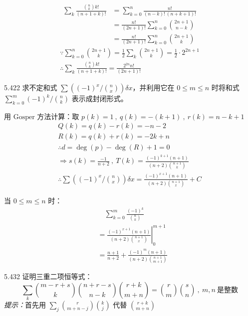 \begin{align*}
  \sum_k \frac{\binom{n}{k} k!}{(n+1+k)!} &= \sum_{k=0}^n \frac{n!}{(n-k)! \ (n+k+1)!} \\
  &= \frac{n!}{(2n+1)!} \sum_{k=0}^n \binom{2n+1}{n-k} \\
  &= \frac{n!}{(2n+1)!} \sum_{k=0}^n \binom{2n+1}{k}
\end{align*}
\begin{gather*}
  \because \sum_{k=0}^n \binom{2n+1}{k} = \frac{1}{2} \sum_k \binom{2n+1}{k} = \frac{1}{2} \cdot 2^{2n+1} \\
  \therefore \sum_k \frac{\binom{n}{k} k!}{(n+1+k)!} = \frac{2^{2n} n!}{(2n+1)!}
\end{gather*}

\begin{problem}{5.42}{2}
  求不定和式 \( \sum \left( (-1)^x / \binom{n}{x} \right) \delta x \)，并利用它在 \( 0 \le m \le n \) 时将和式 \( \sum_{k=0}^m (-1)^k / \binom{n}{k} \) 表示成封闭形式。
\end{problem}

用 \( \text{Gosper} \) 方法计算：取 \( p(k)=1 \ , \ q(k) = -(k+1) \ , \ r(k) = n-k+1 \)
\begin{gather*}
  Q(k) = q(k) - r(k) = -n-2 \\ R(k) = q(k) + r(k) = -2k+n \\
  \therefore d = \deg{(p)} - \deg{(R)} + 1 = 0 \\
  \Rightarrow s(k) = \frac{-1}{n+2} \ , \ T(k) = \frac{(-1)^{k+1} (n+1)}{(n+2) \binom{n+1}{k}} \\
  \therefore \sum \left( (-1)^x / \binom{n}{x} \right) \delta x = \frac{(-1)^{x+1} (n+1)}{(n+2) \binom{n+1}{x}} + C
\end{gather*}

当 \( 0 \le m \le n \) 时：
\begin{align*}
  & \quad \sum_{k=0}^m \frac{(-1)^k}{\binom{n}{k}} \\
  &= \left. \frac{(-1)^{x+1} (n+1)}{(n+2) \binom{n+1}{x}} \right|_0^{m+1} \\
  &= \frac{n+1}{n+2} + \frac{(-1)^m (n+1)}{(n+2) \binom{n+1}{m+1}}
\end{align*}

\begin{problem}{5.43}{2}
  证明三重二项恒等式：
  \[
    \sum_k \binom{m-r+s}{k} \binom{n+r-s}{n-k} \binom{r+k}{m+n} = \binom{r}{m} \binom{s}{n} \ , \ m,n \ \text{是整数}
  \]
  \textit{提示：}首先用 \( \sum_j \binom{r}{m+n-j} \binom{k}{j} \) 代替 \( \binom{r+k}{m+n} \)
\end{problem}

